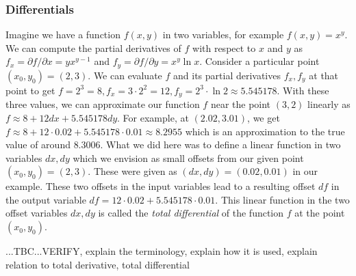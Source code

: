 \subsubsection{Differentials} Imagine we have a function $f(x,y)$ in two variables, for example $f(x,y) = x^y$. We can compute the partial derivatives of $f$ with respect to $x$ and $y$ as $f_x = \partial f / \partial x = y x^{y-1}$ and $f_y = \partial f / \partial y = x^y \ln x$. Consider a particular point $(x_0, y_0) = (2,3)$. We can evaluate $f$ and its partial derivatives $f_x, f_y$ at that point to get $f = 2^3 = 8, f_x = 3 \cdot 2^2 = 12, f_y = 2^3 \cdot \ln 2 \approx 5.545178$. With these three values, we can approximate our function $f$ near the point $(3,2)$ linearly as $f \approx 8 + 12 dx + 5.545178 dy$. For example, at $(2.02,3.01)$, we get $f \approx 8 + 12 \cdot 0.02 + 5.545178 \cdot 0.01 \approx 8.2955$ which is an approximation to the true value of around $8.3006$. What we did here was to define a linear function in two variables $dx,dy$ which we envision as small offsets from our given point $(x_0,y_0) = (2,3)$. These were given as $(dx,dy) = (0.02,0.01)$ in our example. These two offsets in the input variables lead to a resulting offset $df$ in the output variable $df = 12 \cdot 0.02 + 5.545178 \cdot 0.01$. This linear function in the two offset variables $dx, dy$ is called the \emph{total differential} of the function $f$ at the point $(x_0, y_0)$.

...TBC...VERIFY, explain the terminology, explain how it is used, explain relation to total derivative, total differential











